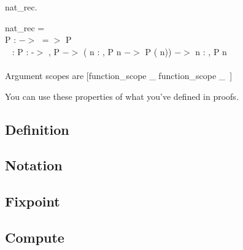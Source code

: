 \begin{code}	 nat\_rec.		\end{code}
\begin{msg}	
	nat\_rec = 								\\
	 P :  $->$  $=>$  P				\\ \-\ \qquad
		:  P :  -$>$ ,					
		  P  $->$						
       			( n : , P n $->$ P ( n)) $->$  n : , P n 
	\\ \\
	Argument scopes are [function\_scope \_ function\_scope \_\ ]
\end{msg}

\noindent
You can use these properties of what you've defined in proofs.







\subsection{Definition} \label{definition}






\subsection{Notation} \label{notation}






\subsection{Fixpoint} \label{fixpoint}






\subsection{Compute} \label{compute}








